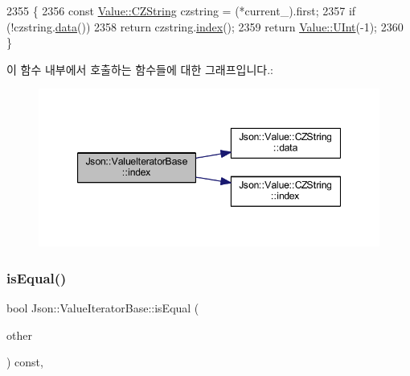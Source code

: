 \begin{DoxyCode}
2355                                     \{
2356   \textcolor{keyword}{const} \hyperlink{class_json_1_1_value_1_1_c_z_string}{Value::CZString} czstring = (*current\_).first;
2357   \textcolor{keywordflow}{if} (!czstring.\hyperlink{class_json_1_1_value_1_1_c_z_string_af6eee54f8dc43a1203d5af6ba0a5c9a2}{data}())
2358     \textcolor{keywordflow}{return} czstring.\hyperlink{class_json_1_1_value_1_1_c_z_string_a0f3ba09401525d4f01dafd577122ee32}{index}();
2359   \textcolor{keywordflow}{return} \hyperlink{class_json_1_1_value_a0933d59b45793ae4aade1757c322a98d}{Value::UInt}(-1);
2360 \}
\end{DoxyCode}
이 함수 내부에서 호출하는 함수들에 대한 그래프입니다.\+:
\nopagebreak
\begin{figure}[H]
\begin{center}
\leavevmode
\includegraphics[width=347pt]{class_json_1_1_value_iterator_base_a549c66a0bd20e9ae772175a5c0d2e88a_cgraph}
\end{center}
\end{figure}
\mbox{\label{class_json_1_1_value_iterator_base_a010b5ad3f3337ae3732e5d7e16ca5e25}} 
\subsubsection{\texorpdfstring{is\+Equal()}{isEqual()}}
{\footnotesize\ttfamily bool Json\+::\+Value\+Iterator\+Base\+::is\+Equal (\begin{DoxyParamCaption}\item[{const \hyperlink{class_json_1_1_value_iterator_base_a9d2a940d03ea06d20d972f41a89149ee}{Self\+Type} \&}]{other }\end{DoxyParamCaption}) const\hspace{0.3cm}{\ttfamily [protected]}, {\ttfamily [inherited]}}



